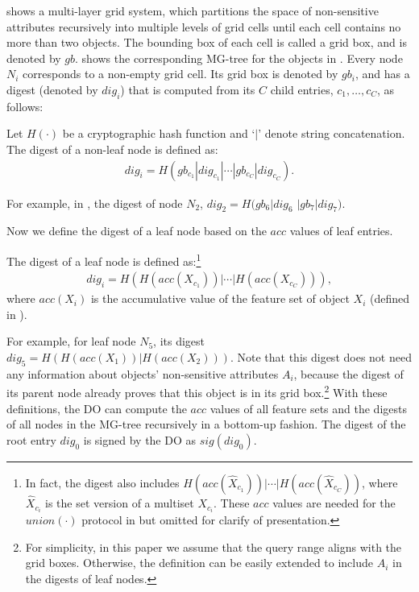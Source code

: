  shows a multi-layer grid system, which partitions the space of non-sensitive attributes recursively into multiple levels of grid cells until each cell contains no more than two objects. The bounding box of each cell is called a grid box, and is denoted by $gb$.  shows the corresponding MG-tree for the objects in . Every node $N_i$ corresponds to a non-empty grid cell. Its grid box is denoted by $gb_i$, and has a digest (denoted by $dig_i$) that is computed from its $C$ child entries, $c_1, \dots, c_C$, as follows:

\begin{definition}
  Let $H(\cdot)$ be a cryptographic hash function and `$|$' denote string concatenation. The digest of a non-leaf node is defined as:
  \begin{align*}
    dig_i = H(gb_{c_1} | dig_{c_1} | \cdots | gb_{c_C} | dig_{c_C} ).
  \end{align*}
\end{definition}
For example, in , the digest of node $N_2$, $dig_2 = H(gb_6 | dig_6$ $| gb_7 | dig_7)$.

Now we define the digest of a leaf node based on the $acc$ values of leaf entries.
\begin{definition}
  The digest of a leaf node is defined as:\footnote{In fact, the digest also includes $H(acc(\widehat{X}_{c_1}))|\cdots|H(acc(\widehat{X}_{c_C}))$, where $\widehat{X}_{c_i}$ is the set version of a multiset $X_{c_i}$. These $acc$ values are needed for the $union(\cdot)$ protocol in  but omitted for clarify of presentation.}
  \begin{align*}
    dig_i = H(H(acc(X_{c_1})) | \cdots | H(acc(X_{c_C})) ),
  \end{align*}
  where $acc(X_i)$ is the accumulative value of the feature set of object $X_i$ (defined in ).
\end{definition}
For example, for leaf node $N_5$, its digest ${dig}_5 = H(H(acc(X_1)) | H(acc(X_2)))$. Note that this digest does not need any information about objects' non-sensitive attributes $A_i$, because the digest of its parent node already proves that this object is in its grid box.\footnote{For simplicity, in this paper we assume that the query range aligns with the grid boxes. Otherwise, the definition can be easily extended to include $A_i$ in the digests of leaf nodes.} With these definitions, the DO can compute the $acc$ values of all feature sets and the digests of all nodes in the MG-tree recursively in a bottom-up fashion. The digest of the root entry $dig_0$ is signed by the DO as $sig(dig_0)$.

